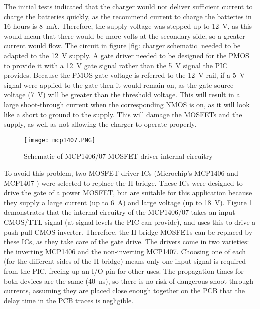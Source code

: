 

The initial tests indicated that the charger would not deliver sufficient current to charge the batteries quickly, as the recommend current to charge the batteries in 16 hours is \SI{8}{\milli\ampere}. Therefore, the supply voltage was stepped up to \SI{12}{\volt}, as this would mean that there would be more volts at the secondary side, so a greater current would flow. The circuit in figure \ref{fig: charger schematic} needed to be adapted to the \SI{12}{\volt} supply. A gate driver needed to be designed for the PMOS to provide it with a \SI{12}{\volt} gate signal rather than the \SI{5}{\volt} signal the PIC provides. Because the PMOS gate voltage is referred to the \SI{12}{\volt} rail, if a \SI{5}{\volt} signal were applied to the gate then it would remain on, as the gate-source voltage (\SI{7}{\volt}) will be greater than the threshold voltage. This will result in a large shoot-through current when the corresponding NMOS is on, as it will look like a short to ground to the supply. This will damage the MOSFETs and the supply, as well as not allowing the charger to operate properly. \\

\begin{figure}[htbp]
	\centering
	\texttt{[image: mcp1407.PNG]}
	\caption{Schematic of MCP1406/07 MOSFET driver internal circuitry \cite{mcp1407}}
	\label{fig: mcp1407}
\end{figure}

To avoid this problem, two MOSFET driver ICs (Microchip's MCP1406 and MCP1407 \cite{mcp1407}) were selected to replace the H-bridge. These ICs were designed to drive the gate of a power MOSFET, but are suitable for this application because they supply a large current (up to \SI{6}{\ampere}) and large voltage (up to \SI{18}{\volt}). Figure \ref{fig: mcp1407} demonstrates that the internal circuitry of the MCP1406/07 takes an input CMOS/TTL signal (at signal levels the PIC can provide), and uses this to drive a push-pull CMOS inverter. Therefore, the H-bridge MOSFETs can be replaced by these ICs, as they take care of the gate drive. The drivers come in two varieties: the inverting MCP1406 and the non-inverting MCP1407. Choosing one of each (for the different sides of the H-bridge) means only one input signal is required from the PIC, freeing up an I/O pin for other uses. The propagation times for both devices are the same (\SI{40}{\nano\second}), so there is no risk of dangerous shoot-through currents, assuming they are placed close enough together on the PCB that the delay time in the PCB traces is negligible.\\

